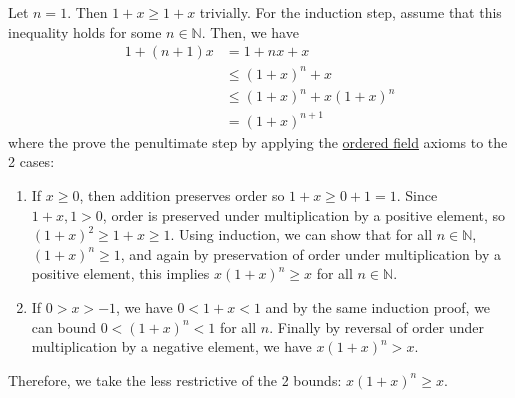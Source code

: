   \begin{exercise}
    Let $n = 1$. Then $1 + x \geq 1 + x$ trivially. For the induction step, assume that this inequality holds for some $n \in \mathbb{N}$. Then, we have 
    \begin{align}
      1 + (n+1) x & = 1 + nx + x \\
                  & \leq (1+x)^n + x \\ 
                  & \leq (1+x)^n + x(1+x)^n \\
                  & = (1+x)^{n+1}
    \end{align} 
    where the prove the penultimate step by applying the \hyperref[alg-def:ordered-field]{ordered field} axioms to the 2 cases: 
    \begin{enumerate}
      \item If $x \geq 0$, then addition preserves order so $1 + x \geq 0 + 1 = 1$. Since $1 + x, 1 > 0$, order is preserved under multiplication by a positive element, so $(1+x)^2 \geq 1+x \geq 1$. Using induction, we can show that for all $n \in \mathbb{N}$, $(1+x)^n \geq 1$, and again by preservation of order under multiplication by a positive element, this implies $x (1 + x)^n \geq x$ for all $n \in \mathbb{N}$. 
      \item If $0 > x > -1$, we have $0 < 1 + x < 1$ and by the same induction proof, we can bound $0 < (1+x)^n < 1$ for all $n$. Finally by reversal of order under multiplication by a negative element, we have $x (1+x)^n > x$. 
    \end{enumerate}
    Therefore, we take the less restrictive of the 2 bounds: $x(1+x)^n \geq x$. 
  \end{exercise}

